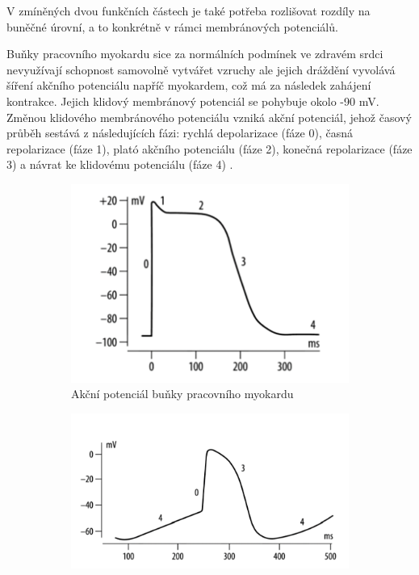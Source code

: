 V zmíněných dvou funkčních částech je také potřeba rozlišovat rozdíly na buněčné
úrovní, a to konkrétně v rámci membránových potenciálů.

Buňky pracovního myokardu sice za normálních podmínek ve zdravém srdci
nevyužívají schopnost samovolně vytvářet vzruchy ale jejich dráždění vyvolává
šíření akčního potenciálu napříč myokardem, což má za následek zahájení
kontrakce. Jejich klidový membránový potenciál se pohybuje okolo -90 mV. Změnou
klidového membránového potenciálu vzniká akční potenciál, jehož časový průběh
sestává z následujících fázi: rychlá depolarizace (fáze 0), časná repolarizace
(fáze 1), plató akčního potenciálu (fáze 2), konečná repolarizace (fáze 3) a
návrat ke klidovému potenciálu (fáze 4) \cite{Petrek2019}.

\begin{figure}[h]
	\centering
	\begin{subfigure}{0.4\textwidth}
		\includegraphics[width=1\textwidth]{../assets/anatomy/myokard_ap}
		\caption{Akční potenciál buňky pracovního myokardu \cite{Petrek2019}}
		\label{fig:myokard_ap}
	\end{subfigure}
	\hfil
	\begin{subfigure}{0.5\textwidth}
		\includegraphics[width=1\textwidth]{../assets/anatomy/pss_ap}

\end{subfigure}
\end{figure}
